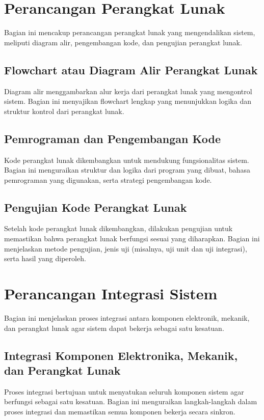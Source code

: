 \section{Perancangan Perangkat Lunak}
Bagian ini mencakup perancangan perangkat lunak yang mengendalikan sistem, meliputi diagram alir, pengembangan kode, dan pengujian perangkat lunak.

\subsection{Flowchart atau Diagram Alir Perangkat Lunak}
Diagram alir menggambarkan alur kerja dari perangkat lunak yang mengontrol sistem. Bagian ini menyajikan flowchart lengkap yang menunjukkan logika dan struktur kontrol dari perangkat lunak.

\subsection{Pemrograman dan Pengembangan Kode}
Kode perangkat lunak dikembangkan untuk mendukung fungsionalitas sistem. Bagian ini menguraikan struktur dan logika dari program yang dibuat, bahasa pemrograman yang digunakan, serta strategi pengembangan kode.

\subsection{Pengujian Kode Perangkat Lunak}
Setelah kode perangkat lunak dikembangkan, dilakukan pengujian untuk memastikan bahwa perangkat lunak berfungsi sesuai yang diharapkan. Bagian ini menjelaskan metode pengujian, jenis uji (misalnya, uji unit dan uji integrasi), serta hasil yang diperoleh.

\section{Perancangan Integrasi Sistem}
Bagian ini menjelaskan proses integrasi antara komponen elektronik, mekanik, dan perangkat lunak agar sistem dapat bekerja sebagai satu kesatuan.

\subsection{Integrasi Komponen Elektronika, Mekanik, dan Perangkat Lunak}
Proses integrasi bertujuan untuk menyatukan seluruh komponen sistem agar berfungsi sebagai satu kesatuan. Bagian ini menguraikan langkah-langkah dalam proses integrasi dan memastikan semua komponen bekerja secara sinkron.

